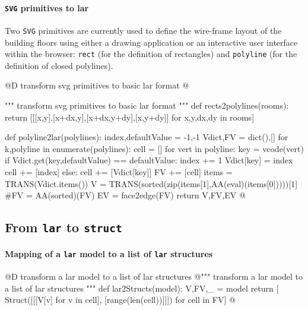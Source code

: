 \documentclass[11pt,oneside]{article}	%
\begin{document}
\paragraph{\texttt{SVG} primitives to lar}
Two \texttt{SVG} primitives are currently used to define the wire-frame layout of the building floors using either a drawing application or an interactive user interface within the browser:  \texttt{rect} (for the definition of rectangles) and \texttt{polyline} (for the definition of closed polylines). 

@D transform svg primitives to basic lar format
@{""" transform svg primitives to basic lar format """
def rects2polylines(rooms): 
	return [[[x,y],[x+dx,y],[x+dx,y+dy],[x,y+dy]] for x,y,dx,dy in rooms]
	
def polyline2lar(polylines):
	index,defaultValue = -1,-1
	Vdict,FV = dict(),[]
	for k,polyline in enumerate(polylines):
		cell = []
		for vert in polyline:
			key = vcode(vert)
			if Vdict.get(key,defaultValue) == defaultValue:
				index += 1
				Vdict[key] = index
				cell += [index]
			else: 
				cell += [Vdict[key]]
		FV += [cell]
	items = TRANS(Vdict.items())
	V = TRANS(sorted(zip(items[1],AA(eval)(items[0]))))[1]
	#FV = AA(sorted)(FV)
	EV = face2edge(FV)
	return V,FV,EV
@}


\subsection{From \texttt{lar} to \texttt{struct}}


\paragraph{Mapping of a \texttt{lar} model to a list of \texttt{lar} structures}

@D transform a lar model to a list of lar structures
@{""" transform a lar model to a list of lar structures """
def lar2Structs(model):
   V,FV,_ = model
   return [ Struct([[[V[v] for v in cell], [range(len(cell))]]]) for cell in FV]
@}
\end{document}
